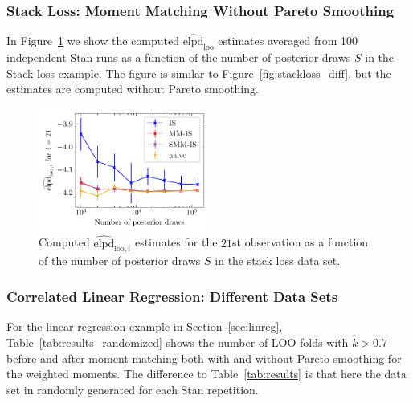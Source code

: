\documentclass[12pt]{article}
\begin{document}
\subsubsection*{Stack Loss: Moment Matching Without Pareto Smoothing}



In Figure~\ref{fig:stackloss_diff2} we show the computed $\widehat{\mathrm{elpd}}_{\mathrm{loo}}$
estimates averaged from 100 independent Stan runs as a function of the number of posterior draws $S$
in the Stack loss example.
The figure is similar to Figure~\ref{fig:stackloss_diff}, but the
estimates are computed without Pareto smoothing.


\begin{figure}[h]
\centering
\includegraphics[width=0.5\textwidth]{figs/stackloss_diff2.pdf}
\caption{Computed $\widehat{\mathrm{elpd}}_{\mathrm{loo},i}$
estimates for the $21$st observation as a function of the number of posterior draws $S$
in the stack loss data set.} \label{fig:stackloss_diff2}
\end{figure}















\subsubsection*{Correlated Linear Regression: Different Data Sets}

For the linear regression example in Section~\ref{sec:linreg},
Table~\ref{tab:results_randomized} shows the number of LOO folds with $\hat{k} > 0.7$
before and after moment matching both with and without Pareto smoothing for the weighted moments. The difference to
Table~\ref{tab:results} is that here the data set in randomly
generated for each Stan repetition.
\end{document}
